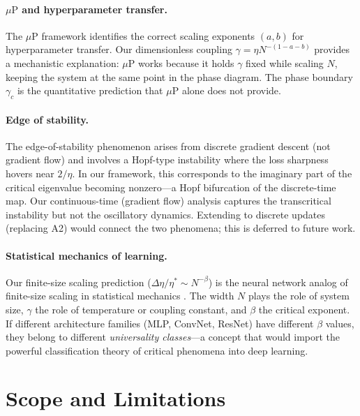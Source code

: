 \documentclass[11pt]{article}
\theoremstyle{definition}
\newcommand{\muP}{\mu\text{P}}
\begin{document}
\paragraph{$\muP$ and hyperparameter transfer.} The $\muP$ framework \citep{yang2021tensor} identifies the correct scaling exponents $(a,b)$ for hyperparameter transfer. Our dimensionless coupling $\gamma = \eta N^{-(1-a-b)}$ provides a mechanistic explanation: $\muP$ works because it holds $\gamma$ fixed while scaling $N$, keeping the system at the same point in the phase diagram. The phase boundary $\gamma_c$ is the quantitative prediction that $\muP$ alone does not provide.

\paragraph{Edge of stability.} The edge-of-stability phenomenon \citep{cohen2021gradient} arises from discrete gradient descent (not gradient flow) and involves a Hopf-type instability where the loss sharpness hovers near $2/\eta$. In our framework, this corresponds to the imaginary part of the critical eigenvalue becoming nonzero---a Hopf bifurcation of the discrete-time map. Our continuous-time (gradient flow) analysis captures the transcritical instability but not the oscillatory dynamics. Extending to discrete updates (replacing A2) would connect the two phenomena; this is deferred to future work.

\paragraph{Statistical mechanics of learning.} Our finite-size scaling prediction ($\Delta\eta/\eta^* \sim N^{-\beta}$) is the neural network analog of finite-size scaling in statistical mechanics \citep{fisher1972scaling}. The width $N$ plays the role of system size, $\gamma$ the role of temperature or coupling constant, and $\beta$ the critical exponent. If different architecture families (MLP, ConvNet, ResNet) have different $\beta$ values, they belong to different \emph{universality classes}---a concept that would import the powerful classification theory of critical phenomena into deep learning.

\section{Scope and Limitations}
\label{sec:limitations}
\end{document}
